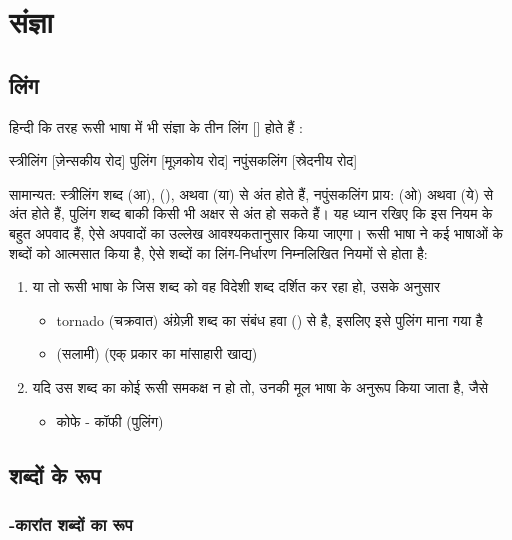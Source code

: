 \chapter{संज्ञा}\label{ch: noun}


\section{लिंग}\label{sec:noun-gender}
हिन्दी कि तरह रूसी भाषा में भी संज्ञा के तीन लिंग []  होते हैं :

स्त्रीलिंग   [ज़ेन्सकीय रोद]
पुलिंग  [मूज़कोय रोद]
नपुंसकलिंग  [स्रेदनीय रोद]

सामान्यत: स्त्रीलिंग शब्द  (आ),  (),  अथवा  (या)  से अंत होते हैं, नपुंसकलिंग प्राय:  (ओ) अथवा
 (ये) से अंत होते हैं, पुलिंग शब्द बाकी किसी भी अक्षर से अंत हो सकते हैं। यह ध्यान रखिए कि इस नियम के बहुत अपवाद हैं, ऐसे अपवादों का उल्लेख
आवश्यकतानुसार किया जाएगा। रूसी भाषा ने कई भाषाओं के शब्दों को आत्मसात किया है, ऐसे शब्दों का लिंग-निर्धारण निम्नलिखित नियमों से होता है:
\begin{enumerate}
    \item या तो रूसी भाषा के जिस शब्द को वह विदेशी शब्द दर्शित कर रहा हो, उसके अनुसार
    \begin{itemize}
        \item tornado (चक्रवात) अंग्रेज़ी शब्द का संबंध हवा () से है, इसलिए इसे पुलिंग माना गया है
        \item (सलामी) (एक् प्रकार का मांसाहारी खाद्य)
    \end{itemize}
    \item  यदि उस शब्द का कोई रूसी समकक्ष न हो तो, उनकी मूल भाषा के अनुरूप किया जाता है, जैसे
    \begin{itemize}
        \item कोफे - कॉफी (पुलिंग)
    \end{itemize}
\end{enumerate}


\section{शब्दों के रूप}\label{sec:noun-endings}

\subsection{-कारांत शब्दों का रूप}\label{subsec:noun-endings-g}
